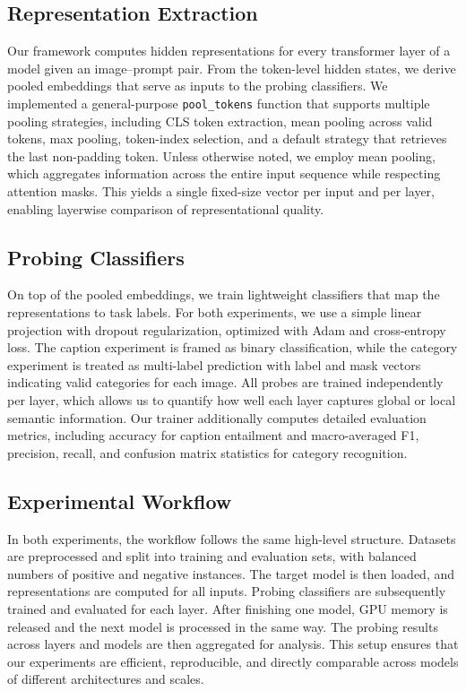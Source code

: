 \documentclass[11pt]{article}
\begin{document}
\subsection{Representation Extraction}
Our framework computes hidden representations for every transformer layer of a model
given an image--prompt pair. From the token-level hidden states, we derive pooled embeddings
that serve as inputs to the probing classifiers. We implemented a general-purpose
\texttt{pool\_tokens} function that supports multiple pooling strategies, including
CLS token extraction, mean pooling across valid tokens, max pooling, token-index selection,
and a default strategy that retrieves the last non-padding token. Unless otherwise noted,
we employ mean pooling, which aggregates information across the entire input sequence
while respecting attention masks. This yields a single fixed-size vector per input
and per layer, enabling layerwise comparison of representational quality.

\subsection{Probing Classifiers}
On top of the pooled embeddings, we train lightweight classifiers that map the
representations to task labels. For both experiments, we use a simple linear
projection with dropout regularization, optimized with Adam and cross-entropy loss.
The caption experiment is framed as binary classification, while the category experiment
is treated as multi-label prediction with label and mask vectors indicating valid
categories for each image. All probes are trained independently per layer, which allows
us to quantify how well each layer captures global or local semantic information.
Our trainer additionally computes detailed evaluation metrics, including accuracy for
caption entailment and macro-averaged F1, precision, recall, and confusion matrix
statistics for category recognition.

\subsection{Experimental Workflow}
In both experiments, the workflow follows the same high-level structure.
Datasets are preprocessed and split into training and evaluation sets, with
balanced numbers of positive and negative instances. The target model is then
loaded, and representations are computed for all inputs. Probing classifiers are subsequently trained
and evaluated for each layer. After finishing one model, GPU memory is released
and the next model is processed in the same way. The probing results across
layers and models are then aggregated for analysis. This setup ensures that
our experiments are efficient, reproducible, and directly comparable across
models of different architectures and scales.
\end{document}
